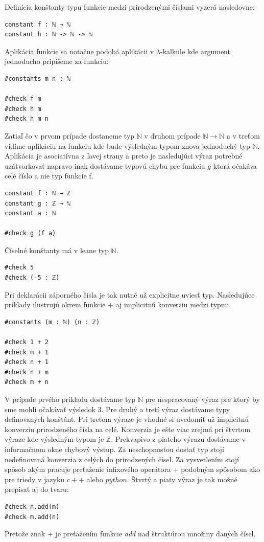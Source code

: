 \documentclass[a4paper,10pt,oneside]{report}%
\begin{document}
    Definícia konštanty typu funkcie medzi prirodzenými číslami vyzerá nasledovne:
\begin{lstlisting}
constant f : ℕ → ℕ
constant h : ℕ -> ℕ -> ℕ
\end{lstlisting}
    Aplikácia funkcie sa notačne podobá aplikácii v $\lambda$-kalkule kde argument
jednoducho pripíšeme za funkciu:
\begin{lstlisting}
#constants m n : ℕ

#check f m
#check h m
#check h m n
\end{lstlisting}
    Zatiaľ čo v prvom prípade dostaneme typ $\mathbb{N}$ v druhom prípade
$\mathbb{N} \to \mathbb{N}$ a v treťom vidíme aplikáciu na funkciu kde bude výsledným
typom znova jednoduchý typ $\mathbb{N}$.
    Aplikácia je asociatívna z ľavej strany a  preto je nasledujúci výraz potrebné 
uzátvorkovať napravo inak dostávame typovú chybu pre funkciu $g$ ktorá očakáva 
celé číslo a nie typ funkcie f.
\begin{lstlisting}
constant f : ℕ → ℤ
constant g : ℤ → ℕ
constant a : ℕ

#check g (f a)
\end{lstlisting}
    Číselné konštanty má v leane typ $\mathbb{N}$.
\begin{lstlisting}
#check 5
#check (-5 : ℤ)
\end{lstlisting}
    Pri deklarácii záporného čísla je tak nutné už explicitne uviesť typ.
Nasledujúce príklady ilustrujú okrem funkcie $+$ aj implicitnú konverziu medzi typmi.
\begin{lstlisting}
#constants (m : ℕ) (n : ℤ)

#check 1 + 2
#check m + 1
#check n + 1
#check n + m
#check m + n
\end{lstlisting}
    V prípade prvého príkladu dostávame typ $\mathbb{N}$ pre nespracovaný výraz pre
ktorý by sme mohli očakávať výsledok $3$.
    Pre druhý a tretí výraz dostávame typy definovaných konštánt.
    Pri treťom výraze je vhodné si uvedomiť už implicitnú konverziu prirodzeného
čísla na celé.
    Konverzia je ešte viac zrejmá pri štvrtom výraze kde výsledným typom je
$\mathbb{Z}$.
    Prekvapivo z piateho výrazu dostávame v informačnom okne chybový výstup.
    Za neschopnosťou dostať typ stojí nedefinovaná konverzia z celých do prirodzených
čísel.
    Za vysvetlením stojí spôsob akým pracuje preťaženie infixového operátora $+$
podobným spôsobom ako pre triedy v jazyku $c++$ alebo $python$. Štvrtý a piaty
výraz je tak možné prepísať aj do tvaru:
\begin{lstlisting}
#check n.add(m)
#check m.add(n)
\end{lstlisting}
    Pretože znak $+$ je preťažením funkcie \emph{add} nad štruktúrou množiny daných
čísel.
\end{document}
